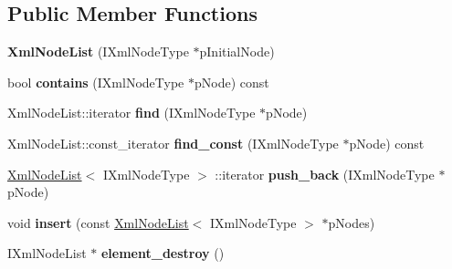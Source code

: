 \subsection*{\-Public \-Member \-Functions}
\begin{DoxyCompactItemize}
\item 
\hypertarget{classgeneral__server_1_1XmlNodeList_a48637ebf8b89fdd564c34f2570e6f379}{{\bfseries \-Xml\-Node\-List} (\-I\-Xml\-Node\-Type $\ast$p\-Initial\-Node)}\label{classgeneral__server_1_1XmlNodeList_a48637ebf8b89fdd564c34f2570e6f379}

\item 
\hypertarget{classgeneral__server_1_1XmlNodeList_a17634d20677fda04d0de42d961c5f432}{bool {\bfseries contains} (\-I\-Xml\-Node\-Type $\ast$p\-Node) const }\label{classgeneral__server_1_1XmlNodeList_a17634d20677fda04d0de42d961c5f432}

\item 
\hypertarget{classgeneral__server_1_1XmlNodeList_aedd79e1c8f03c9aa88c2d48ec665edcc}{\-Xml\-Node\-List\-::iterator {\bfseries find} (\-I\-Xml\-Node\-Type $\ast$p\-Node)}\label{classgeneral__server_1_1XmlNodeList_aedd79e1c8f03c9aa88c2d48ec665edcc}

\item 
\hypertarget{classgeneral__server_1_1XmlNodeList_ae91c79c40e045986345f179867e14b0b}{\-Xml\-Node\-List\-::const\-\_\-iterator {\bfseries find\-\_\-const} (\-I\-Xml\-Node\-Type $\ast$p\-Node) const }\label{classgeneral__server_1_1XmlNodeList_ae91c79c40e045986345f179867e14b0b}

\item 
\hypertarget{classgeneral__server_1_1XmlNodeList_a72df514eefe842c4231390bc39755549}{\hyperlink{classgeneral__server_1_1XmlNodeList}{\-Xml\-Node\-List}$<$ \-I\-Xml\-Node\-Type $>$\*
\-::iterator {\bfseries push\-\_\-back} (\-I\-Xml\-Node\-Type $\ast$p\-Node)}\label{classgeneral__server_1_1XmlNodeList_a72df514eefe842c4231390bc39755549}

\item 
\hypertarget{classgeneral__server_1_1XmlNodeList_a3241731cb1e685e3bbb21f1ff2dfb1f0}{void {\bfseries insert} (const \hyperlink{classgeneral__server_1_1XmlNodeList}{\-Xml\-Node\-List}$<$ \-I\-Xml\-Node\-Type $>$ $\ast$p\-Nodes)}\label{classgeneral__server_1_1XmlNodeList_a3241731cb1e685e3bbb21f1ff2dfb1f0}

\item 
\hypertarget{classgeneral__server_1_1XmlNodeList_aba30ac1c9161bf0831cb80628975f3b0}{\-I\-Xml\-Node\-List $\ast$ {\bfseries element\-\_\-destroy} ()}\label{classgeneral__server_1_1XmlNodeList_aba30ac1c9161bf0831cb80628975f3b0}


\end{DoxyCompactItemize}
